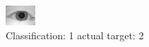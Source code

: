 \begin{figure}[h!]
\begin{center}
\includegraphics[width=0.60\columnwidth]{figures/ID1026_class_1_target_2.png}
\end{center}
\caption{ Classification: 1 actual target: 2}
\label{fig:ID1026_class_1_target_2}
\end{figure}
